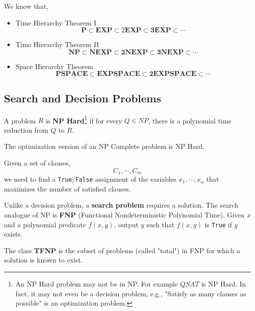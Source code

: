 	\begin{thm} We know that,
		\begin{itemize}
			\item Time Hierarchy Theorem I
			\[\mathbf{P} \subset \mathbf{E X P} \subset 2 \mathbf{E X P} \subset \mathbf{3 E X P} \subset \cdots\]
			\item Time Hierarchy Theorem II
			\[\mathbf{N P} \subset \mathbf{N E X P} \subset \mathbf{2 N E X P} \subset \mathbf{3 N E X P} \subset \cdots\]
			\item Space Hierarchy Theorem
			\[\mathbf{PSPACE} \subset \mathbf{EXPSPACE} \subset \mathbf{2 E X P S P A C E} \subset \cdots\]
		\end{itemize}
	\end{thm}

	\subsection{Search and Decision Problems}
	\begin{defn}[NP Hard]
		A problem $R$ is \textbf{NP Hard}\footnote{An NP Hard problem may not be in NP. For example $QSAT$ is NP Hard. In fact, it may not even be a decision problem, e.g., "Satisfy as many clauses as possible" is an optimization problem.} if for every $Q \in NP$, there is a polynomial time reduction from $Q$ to $R$.
	\end{defn}

	\begin{marginfigure}
		The optimization version of an NP Complete problem is NP Hard.
	\end{marginfigure}

	\begin{defn}
		Given a set of clauses,
		\[C_1, \cdots, C_m\]
		\noindent we need to find a \texttt{True}/\texttt{False} assignment of the variables $x_1, \cdots, x_n$ that maximizes the number of satisfied clauses.
 	\end{defn}

 	\begin{defn}[FNP]
 		Unlike a decision problem, a \textbf{search problem} requires a solution. The search analogue of NP is \textbf{FNP} (Functional Nondeterministic Polynomial Time). Given $x$ and a polynomial predicate $f(x,y)$, output $y$ such that $f(x,y)$ is \texttt{True} if $y$ exists.
 	\end{defn}

 	\begin{defn}[TFNP]
 		The class \textbf{TFNP} is the subset of problems (called "total") in FNP for which a solution is known to exist.
 	\end{defn}

